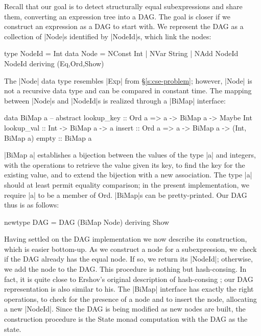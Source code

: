 \documentclass[submission,copyright,creativecommons]{eptcs}
\begin{document}
Recall that our goal is to detect structurally equal subexpressions
and share them, converting an expression tree into a DAG. The
goal is closer if we construct an expression as a DAG to start with. We
represent the DAG as a collection of |Node|s identified by |NodeId|s,
which link the nodes:
\begin{code}
type NodeId = Int
data Node = NConst Int
	  | NVar   String
	  | NAdd   NodeId NodeId
	    deriving (Eq,Ord,Show)
\end{code}
The |Node| data type resembles |Exp| from \S\ref{s:cse-problem};
however, |Node| is not a recursive data type and can be compared in
constant time. The mapping between |Node|s and |NodeId|s is realized
through a |BiMap| interface:
\begin{code}
data BiMap a -- abstract
lookup_key :: Ord a => a -> BiMap a -> Maybe Int
lookup_val :: Int -> BiMap a -> a
insert     :: Ord a => a -> BiMap a -> (Int, BiMap a)
empty      :: BiMap a
\end{code}
|BiMap a| establishes a bijection between the values of the type |a|
and integers, with the operations to retrieve the value given its key,
to find the key for the existing value, and to extend the bijection
with a new association. The type |a| should at least permit equality
comparison; in the present implementation, we require |a| to be a
member of Ord. |BiMap|s can be pretty-printed. Our DAG thus is as
follows:
\begin{code}
newtype DAG = DAG (BiMap Node) deriving Show
\end{code}

Having settled on the DAG implementation we now describe its construction,
which is easier bottom-up. As we construct a node for a subexpression,
we check if the DAG already has the equal node. If so, we return
its |NodeId|; otherwise, we add the node to the DAG. This procedure is
nothing but hash-consing. In fact, it is quite close to Ershov's
original description of hash-consing \cite{Ershov-hash-consing}; our
DAG representation is also similar to his.  The |BiMap|
interface has exactly the right operations, to check for the presence
of a node and to insert the node, allocating a new |NodeId|. Since
the DAG is being modified as new nodes are built, the construction 
procedure is the State monad computation with the DAG as the
state.
\end{document}
